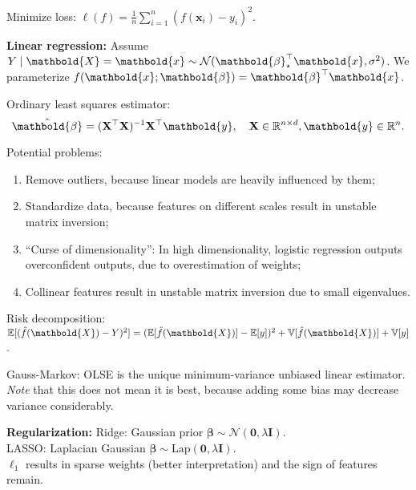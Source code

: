 \documentclass[9pt]{extarticle}
\newenvironment{topic}[1]
{\textbf{\sffamily \colorbox{black}{\rlap{\textbf{\textcolor{white}{#1}}}\hspace{\linewidth}\hspace{-2\fboxsep}}}}
{}
\newenvironment{subtopic}[1]
{\textbf{\sffamily #1:}}
{}
\renewcommand{\mat}[1]{\ensuremath{\mathbf{#1}}}
\renewcommand{\vec}[1]{\ensuremath{\mathbold{#1}}}
\renewcommand{\Var}{\mathbb{V}}
\begin{document}
\begin{multicols*}{3}
    \begin{topic}{Regression}
        Minimize loss: $\ell(f) = \frac{1}{n} \sum_{i=1}^{n} (f(\vec{x}_i) - y_i)^2$.

        \begin{subtopic}{Linear regression}
            Assume $Y \mid \vec{X} = \vec{x} \sim \mathcal{N}(\transpose{\vec{\beta}_\star} \vec{x},
                \sigma^2)$. We parameterize $f(\vec{x}; \vec{\beta}) = \transpose{\vec{\beta}} \vec{x}$.

            Ordinary least squares estimator: \[
                \hat{\vec{\beta}} = \inv{(\transpose{\mat{X}} \mat{X})} \transpose{\mat{X}} \vec{y}, \quad \mat{X} \in \R^{n \times d}, \vec{y} \in \R^n.
            \]

            Potential problems:
            \begin{enumerate}[left=0pt]
                \item Remove outliers, because linear models are heavily influenced by them;
                \item Standardize data, because features on different scales result in unstable matrix inversion;
                \item ``Curse of dimensionality'': In high dimensionality, logistic regression
                      outputs overconfident outputs, due to overestimation of weights;
                \item Collinear features result in unstable matrix inversion due to small eigenvalues.
            \end{enumerate}

            Risk decomposition: $\E[(\hat{f}(\vec{X}) - Y)^2] = (\E[\hat{f}(\vec{X})] - \E[y])^2 +
                \Var[\hat{f}(\vec{X})] + \Var[y]$.

            Gauss-Markov: OLSE is the unique minimum-variance unbiased linear estimator. \textit{Note} that
            this does not mean it is best, because adding some bias may decrease variance considerably.
        \end{subtopic}

        \begin{subtopic}{Regularization}
            Ridge: Gaussian prior $\vec{\beta} \sim \mathcal{N}(\vec{0}, \lambda \mat{I})$. \\
            LASSO: Laplacian Gaussian $\vec{\beta} \sim \mathrm{Lap}(\vec{0}, \lambda \mat{I})$. \\
            $\ell_1$ results in sparse weights (better interpretation) and the sign of features remain.
        \end{subtopic}


\end{topic}
\end{multicols*}
\end{document}
